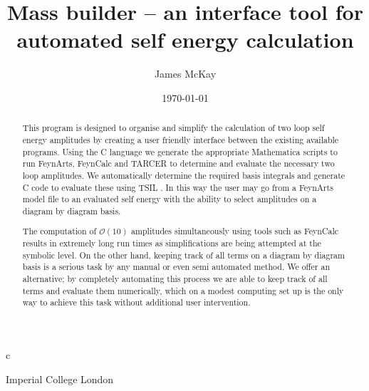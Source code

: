 c



\def\A{\mathcal{A}}
\def\B{\mathcal{B}}
\def\C{\mathcal{C}}

\newcommand{\mb}{\textsf{Mass Builder} }
\newcommand{\mbs}{\textsf{Mass Builder}}
\newcommand{\tsil}{\textsf{TSIL} }
\newcommand{\tsils}{\textsf{TSIL}}
\newcommand{\tarcer}{\textsf{TARCER} }
\newcommand{\tarcers}{\textsf{TARCER}}
\newcommand{\sarah}{\textsf{SARAH} }
\newcommand{\sarahs}{\textsf{SARAH}}
\newcommand{\feynarts}{\textsf{FeynArts} }
\newcommand{\feynartss}{\textsf{FeynArts}}
\newcommand{\feyncalc}{\textsf{FeynCalc} }
\newcommand{\feyncalcs}{\textsf{FeynCalc}}
\newcommand{\cmake}{\textsf{cmake} }

\newcommand{\mathematica}{\textsf{Mathematica} }



\newcommand{\CC}{C\nolinebreak\hspace{-.05em}\raisebox{.4ex}{\tiny\bf +}\nolinebreak\hspace{-.10em}\raisebox{.4ex}{\tiny\bf +} }

\graphicspath{ {Figures/}}

\title{Mass builder -- an interface tool for automated self energy calculation}
%
\author
{
  James McKay
}
%
%
\institute
{
  Imperial College London\label{addr1}
}
%
\date{\today}

\maketitle

\begin{abstract}

This program is designed to organise and simplify the calculation of two loop self energy amplitudes by creating a user friendly interface between the existing available programs.  Using the \CC language we generate the appropriate Mathematica scripts to run \feynartss, \feyncalc and \tarcer to determine and evaluate the necessary two loop amplitudes.  We automatically determine the required basis integrals and generate \CC code to evaluate these using \tsil.  In this way the user may go from a \feynarts model file to an evaluated self energy with the ability to select amplitudes on a diagram by diagram basis.

The computation of $\mathcal{O}(10)$ amplitudes simultaneously using tools such as \feyncalc results in extremely long run times as simplifications are being attempted at the symbolic level.  On the other hand, keeping track of all terms on a diagram by diagram basis is a serious task by any manual or even semi automated method.  We offer an alternative; by completely automating this process we are able to keep track of all terms and evaluate them numerically, which on a modest computing set up is the only way to achieve this task without additional user intervention.

\end{abstract}

